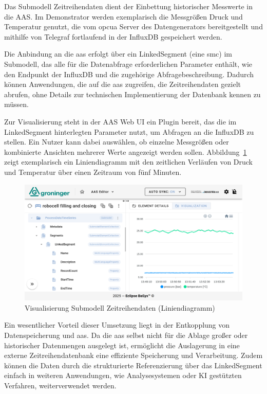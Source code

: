 Das Submodell Zeitreihendaten dient der Einbettung historischer Messwerte in die AAS.
Im Demonstrator werden exemplarisch die Messgrößen Druck und Temperatur genutzt, die vom \acs{opcua} Server des Datengenerators bereitgestellt und mithilfe von Telegraf fortlaufend in der InfluxDB gespeichert werden.

Die Anbindung an die \acs{aas} erfolgt über ein LinkedSegment (eine \acs{smc}) im Submodell, das alle für die Datenabfrage erforderlichen Parameter enthält, wie den Endpunkt der InfluxDB und die zugehörige Abfragebeschreibung. 
Dadurch können Anwendungen, die auf die \acs{aas} zugreifen, die Zeitreihendaten gezielt abrufen, ohne Details zur technischen Implementierung der Datenbank kennen zu müssen.

Zur Visualisierung steht in der AAS Web UI ein Plugin bereit, das die im LinkedSegment hinterlegten Parameter nutzt, um Abfragen an die InfluxDB zu stellen.
Ein Nutzer kann dabei auswählen, ob einzelne Messgrößen oder kombinierte Ansichten mehrerer Werte angezeigt werden sollen. 
Abbildung~\ref{fig:LiniendiagrammBaSyx} zeigt exemplarisch ein Liniendiagramm mit den zeitlichen Verläufen von Druck und Temperatur über einen Zeitraum von fünf Minuten.

\begin{figure}[htbp]
    \centering
        \includegraphics[width=1\textwidth]{Bilder/ErgebnisseAASWebUI/Zeitreihen.png}
    \caption[Visualisierung Submodell Zeitreihendaten]{Visualisierung Submodell Zeitreihendaten (Liniendiagramm)}
    \label{fig:LiniendiagrammBaSyx}
\end{figure}
\vspace{-0.5em}

Ein wesentlicher Vorteil dieser Umsetzung liegt in der Entkopplung von Datenspeicherung und \acs{aas}. 
Da die \acs{aas} selbst nicht für die Ablage großer oder historischer Datenmengen ausgelegt ist, ermöglicht die Auslagerung in eine externe Zeitreihendatenbank eine effiziente Speicherung und Verarbeitung. 
Zudem können die Daten durch die strukturierte Referenzierung über das LinkedSegment einfach in weiteren Anwendungen, wie Analysesystemen oder KI gestützten Verfahren, weiterverwendet werden.

